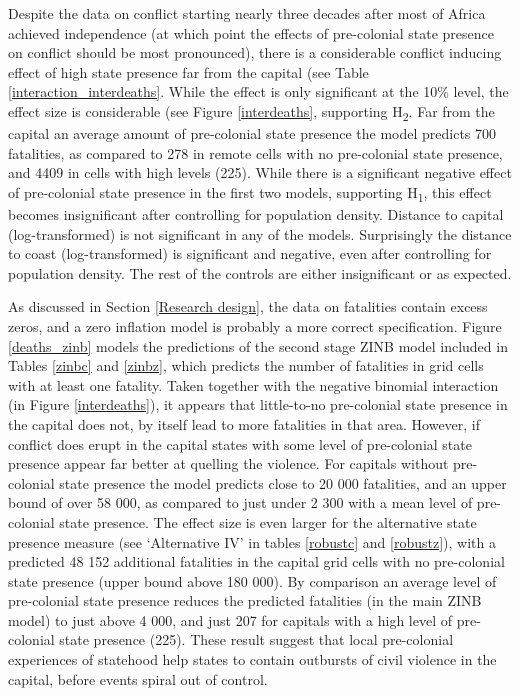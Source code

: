 \documentclass[12pt]{article}
\begin{document}
Despite the data on conflict starting nearly three decades after most of Africa
achieved independence (at which point the effects of pre-colonial state presence
on conflict should be most pronounced), there is a considerable conflict
inducing effect of high state presence far from the capital (see Table
\ref{interaction_interdeaths}. While the effect is only significant at the 10\%
level, the effect size is considerable (see Figure \ref{interdeaths}, supporting
H\textsubscript{2}. Far from the capital an average amount of pre-colonial state
presence the model predicts 700 fatalities, as compared to 278 in remote cells
with no pre-colonial state presence, and 4409 in cells with high levels (225).
While there is a significant negative effect of pre-colonial state presence in
the first two models, supporting H\textsubscript{1}, this effect becomes
insignificant after controlling for population density. Distance to capital
(log-transformed) is not significant in any of the models. Surprisingly the
distance to coast (log-transformed) is significant and negative, even after
controlling for population density. The rest of the controls are either
insignificant or as expected.

As discussed in Section \ref{Research design}, the data on fatalities contain
excess zeros, and a zero inflation model is probably a more correct
specification. Figure \ref{deaths_zinb} models the predictions of the second
stage ZINB model included in Tables \ref{zinbc} and \ref{zinbz}, which predicts
the number of fatalities in grid cells with at least one fatality. Taken
together with the negative binomial interaction (in Figure \ref{interdeaths}),
it appears that little-to-no pre-colonial state presence in the capital does
not, by itself lead to more fatalities in that area. However, if conflict does
erupt in the capital states with some level of pre-colonial state presence
appear far better at quelling the violence. For capitals without pre-colonial
state presence the model predicts close to 20 000 fatalities, and an upper bound
of over 58 000, as compared to just under 2 300 with a mean level of
pre-colonial state presence. The effect size is even larger for the alternative
state presence measure (see `Alternative IV' in tables \ref{robustc} and
\ref{robustz}), with a predicted 48 152 additional fatalities in the capital
grid cells with no pre-colonial state presence (upper bound above 180 000). By
comparison an average level of pre-colonial state presence reduces the predicted
fatalities (in the main ZINB model) to just above 4 000, and just 207 for
capitals with a high level of pre-colonial state presence (225). These result
suggest that local pre-colonial experiences of statehood help states to contain
outbursts of civil violence in the capital, before events spiral out of control.
\end{document}
